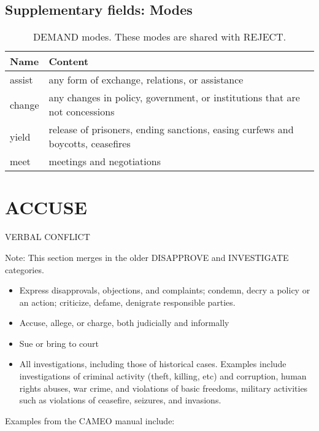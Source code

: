 \documentclass[11pt]{report}
\begin{document}
\subsection{Supplementary fields: Modes}


\begin{table}[htp]
\caption{DEMAND modes. These modes are shared with REJECT.}
\begin{center}
\begin{tabular}{|l|p{13cm}|}
\hline
Name & Content \\
\hline
assist & any form of exchange, relations, or assistance\\
change & any changes in policy, government, or institutions that are not concessions \\
yield & release of prisoners, ending sanctions, easing curfews and boycotts, ceasefires\\
meet & meetings and negotiations\\
\hline
\end{tabular}
\end{center}
\label{tab:demandmode2}
\end{table}%

\newpage  


\section{ACCUSE}

\textsf{VERBAL CONFLICT} \vspace{8pt}

Note: This section merges in the older DISAPPROVE and INVESTIGATE categories.

\begin{itemize}
	\item Express disapprovals, objections, and complaints; condemn, decry a policy or an action; criticize, defame, denigrate responsible parties.
	\item Accuse, allege, or charge, both judicially and informally
	\item Sue or bring to court
	\item All investigations, including those of historical cases. Examples include investigations of  criminal activity (theft, killing, etc) and corruption, human rights abuses, war crime, and violations of basic freedoms, military activities such as violations of ceasefire, seizures, and invasions.
\end{itemize}

Examples from the CAMEO manual include:
\end{document}
